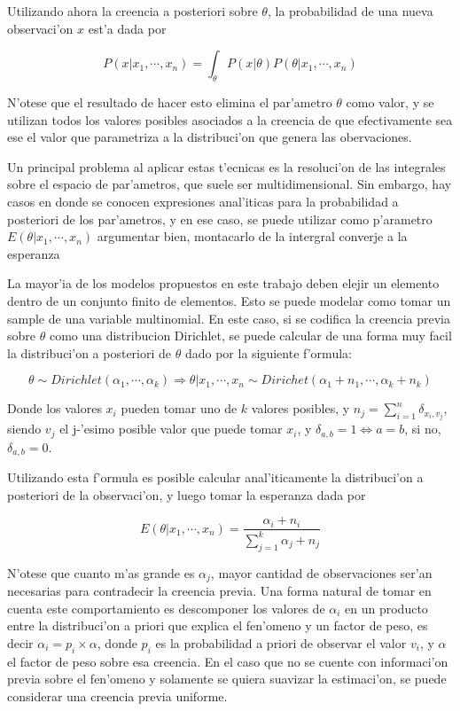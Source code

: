 Utilizando ahora la creencia a posteriori sobre $\theta$, la probabilidad de una nueva observaci'on $x$ est'a dada por

$$P(x|x_1,\cdots,x_n) = \int_\theta{P(x|\theta)P(\theta|x_1,\cdots,x_n)}$$

N'otese que el resultado de hacer esto elimina el par'ametro $\theta$ como valor, y se utilizan todos los valores posibles asociados a la creencia de que efectivamente
sea ese el valor que parametriza a la distribuci'on que genera las obervaciones.


Un principal problema al aplicar estas t'ecnicas es la resoluci'on de las integrales sobre el espacio de par'ametros, que suele ser multidimensional. 
Sin embargo, hay casos en donde se conocen expresiones anal'iticas para la probabilidad a posteriori de los par'ametros, y en ese caso, se puede utilizar
como p'arametro $E(\theta|x_1,\cdots,x_n)$ \alert{argumentar bien, montacarlo de la intergral converje a la esperanza}%

La mayor'ia de los modelos propuestos en este trabajo deben elejir un elemento dentro de un conjunto finito de elementos. Esto
se puede modelar como tomar un sample de una variable multinomial. En este caso, si se codifica la creencia previa
sobre $\theta$ como una distribucion Dirichlet, se puede calcular de una forma muy facil la distribuci'on a posteriori de $\theta$ dado por la siguiente
f'ormula:

$$ \theta \sim Dirichlet(\alpha_1,\cdots,\alpha_k) \Rightarrow \theta|x_1,\cdots,x_n \sim Dirichet(\alpha_1+n_1,\cdots,\alpha_k+n_k)$$

Donde los valores $x_i$ pueden tomar uno de $k$ valores posibles, y $n_j=\sum_{i=1}^n\delta_{x_i, v_j}$, siendo $v_j$ el j-'esimo posible valor 
que puede tomar $x_i$, y $\delta_{a,b} = 1 \Leftrightarrow a = b$, si no, $\delta_{a, b} = 0$. 

Utilizando esta f'ormula es posible calcular anal'iticamente la distribuci'on a posteriori de la observaci'on, y luego tomar la esperanza dada por

$$E(\theta|x_1,\cdots,x_n)=\frac{\alpha_i + n_i}{\sum_{j=1}^{k}{\alpha_j+n_j}}$$

N'otese que cuanto m'as grande es $\alpha_j$, mayor cantidad de observaciones ser'an necesarias para contradecir la creencia previa. 
Una forma natural de tomar en cuenta este comportamiento es descomponer los valores de $\alpha_i$ en un producto entre la distribuci'on a priori que explica el fen'omeno 
y un factor de peso, es decir 
$\alpha_i=p_i\times\alpha$, donde $p_i$ es la probabilidad a priori de observar el valor $v_i$, y $\alpha$ el factor de peso sobre esa creencia. En
el caso que no se cuente con informaci'on previa sobre el fen'omeno y solamente se quiera suavizar la estimaci'on, se puede considerar una creencia
previa uniforme.

